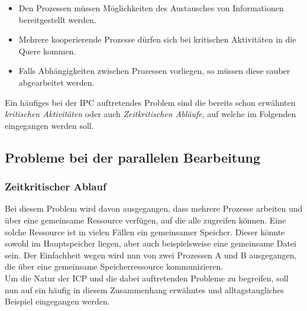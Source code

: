 		\begin{itemize}
			\item Den Prozessen müssen Möglichkeiten des Austausches von Informationen bereitgestellt werden.
			\item Mehrere kooperierende Prozesse dürfen sich bei kritischen Aktivitäten in die Quere kommen.
			\item Falls Abhängigkeiten zwischen Prozessen vorliegen, so müssen diese sauber abgearbeitet werden.			
		\end{itemize}
	
		Ein häufiges bei der IPC auftretendes Problem sind die bereits schon erwähnten \textit{kritischen Aktivitäten} oder auch \textit{Zeitkritischen Abläufe}, auf welche im Folgenden eingegangen werden soll.
		
		\subsection{Probleme bei der parallelen Bearbeitung}
		
			\subsubsection{Zeitkritischer Ablauf}
				\label{ZeitkritischerAblauf}
			
				Bei diesem Problem wird davon ausgegangen, dass mehrere Prozesse arbeiten und über eine gemeinsame Ressource verfügen, auf die alle zugreifen können. Eine solche Ressource ist in vielen Fällen ein gemeinsamer Speicher. Dieser könnte sowohl im Hauptspeicher liegen, aber auch beispielsweise eine gemeinsame Datei sein. Der Einfachheit wegen wird nun von zwei Prozessen A und B ausgegangen, die über eine gemeinsame Speicherressource kommunizieren.\\
				Um die Natur der ICP und die dabei auftretenden Probleme zu begreifen, soll nun auf ein häufig in diesem Zusammenhang erwähntes und alltagstaugliches Beispiel eingegangen werden.
				
